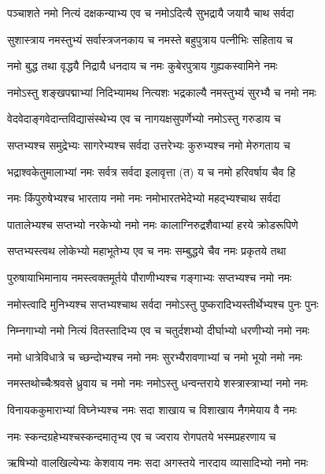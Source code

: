 \twolineshloka
{पञ्चाशते नमो नित्यं दक्षकन्याभ्य एव च}
{नमोऽदित्यै सुभद्रायै जयायै चाथ सर्वदा}

\twolineshloka
{सुशास्त्राय नमस्तुभ्यं सर्वास्त्रजनकाय च}
{नमस्ते बहुपुत्राय पत्नीभिः सहिताय च}

\twolineshloka
{नमो बुद्ध तथा वृद्धयै निद्रायै धनदाय च}
{नमः कुबेरपुत्राय\footnotemark{} गुह्यकस्वामिने नमः}

\twolineshloka
{नमोऽस्तु शङ्खपद्माभ्यां निदिभ्यामथ नित्यशः}
{भद्रकाल्यै नमस्तुभ्यं सुरभ्यै च नमो नमः}

\twolineshloka
{वेदवेदाङ्गवेदान्तविद्यासंस्थेभ्य एव च}
{नागयक्षसुपर्णेभ्यो नमोऽस्तु गरुडाय च}

\twolineshloka
{सप्तभ्यश्च समुद्रेभ्यः सागरेभ्यश्च सर्वदा}
{उत्तरेभ्यः कुरुभ्यश्च नमो मेरुगताय\footnotemark{} च}

\twolineshloka
{भद्राश्वकेतुमालाभ्यां नमः सर्वत्र सर्वदा}
{इलावृत्ता (त) य च नमो हरिवर्षाय चैव हि}

\twolineshloka
{नमः किंपुरुषेभ्यश्च भारताय नमो नमः}
{नमोभारतभेदेभ्यो\footnotemark{}  महद्भ्यश्चाथ सर्वदा}

\twolineshloka
{पातालेभ्यश्च सप्तभ्यो नरकेभ्यो नमो नमः}
{कालाग्निरुद्रशैवाभ्यां हरये क्रोडरूपिणे}

\twolineshloka
{सप्तभ्यस्त्वथ लोकेभ्यो महाभूतेभ्य एव च}
{नमः सम्बुद्धये चैव नमः प्रकृतये तथा}

\twolineshloka
{पुरुषायाभिमानाय नमस्त्वक्तमूर्तये}
{पौराणीभ्यश्च गङ्गाभ्यः सप्तभ्यश्च नमो नमः}

\twolineshloka
{नमोस्त्वादि मुनिभ्यश्च सप्तभ्यश्चाथ सर्वदा}
{नमोऽस्तु पुष्करादिभ्यस्तीर्थेभ्यश्च पुनः पुनः}

\twolineshloka
{निम्नगाभ्यो नमो नित्यं वितस्तादिभ्य एव च}
{चतुर्दशभ्यो दीर्घाभ्यो धरणीभ्यो नमो नमः}

\twolineshloka
{नमो धात्रेविधात्रे च च्छन्दोभ्यश्च नमो नमः}
{सुरभ्यैरावणाभ्यां च नमो भूयो नमो नमः}

\twolineshloka
{नमस्तथोच्चैःश्रवसे ध्रुवाय च नमो नमः}
{नमोऽस्तु धन्वन्तराये शस्त्रास्त्राभ्यां नमो नमः}

\twolineshloka
{विनायककुमाराभ्यां विघ्नेभ्यश्च नमः सदा}
{शाखाय च विशाखाय नैगमेयाय वै नमः}

\twolineshloka
{नमः स्कन्दग्रहेभ्यश्चस्कन्दमातृभ्य एव च}
{ज्वराय रोगपतये भस्मप्रहरणाय च}

\twolineshloka
{ऋषिभ्यो वालखिल्येभ्यः केशवाय नमः सदा}
{अगस्तये नारदाय व्यासादिभ्यो नमो नमः}

